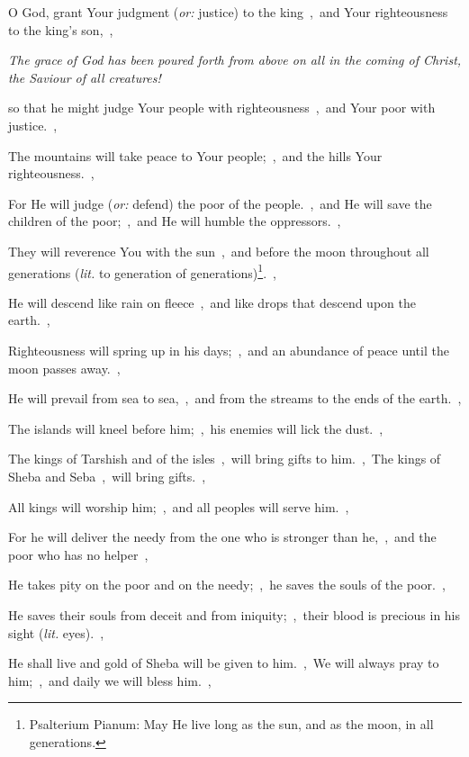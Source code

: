 \documentclass[12pt,twoside,a5paper]{article}
\newcommand{\qanona}[1]{{\liturgicalhint{Qanona.} \emph{#1}}}
\newcommand{\translationoption}[1]{\emph{or:} #1}
\newcommand{\translationliteral}[1]{\emph{lit.} #1}
\begin{document}
\begin{normalparskip}
  O God, grant Your judgment (\translationoption{justice}) to the king~\sep\ and Your righteousness to the king's son,~\sep

  \qanona{The grace of God has been poured forth from above on all in the coming of Christ, the Saviour of all creatures!}

  so that he might judge Your people with righteousness~\sep\ and Your poor with justice.~\sep

  The mountains will take peace to Your people;~\sep\ and the hills Your righteousness.~\sep

  For He will judge (\translationoption{defend}) the poor of the people.~\sep\ and He will save the children of the poor;~\sep\ and He will humble the oppressors.~\sep

  They will reverence You with the sun~\sep\ and before the moon throughout all generations (\translationliteral{to generation of generations})\footnote{Psalterium Pianum: May He live long as the sun, and as the moon, in all generations.}.~\sep

  He will descend like rain on fleece~\sep\ and like drops that descend upon the earth.~\sep

  Righteousness will spring up in his days;~\sep\ and an abundance of peace until the moon passes away.~\sep

  He will prevail from sea to sea,~\sep\ and from the streams to the ends of the earth.~\sep

  The islands will kneel before him;~\sep\ his enemies will lick the dust.~\sep

  The kings of Tarshish and of the isles~\sep\ will bring gifts to him.~\sep\ The kings of Sheba and Seba~\sep\ will bring gifts.~\sep

  All kings will worship him;~\sep\ and all peoples will serve him.~\sep

  For he will deliver the needy from the one who is stronger than he,~\sep\ and the poor who has no helper~\sep

  He takes pity on the poor and on the needy;~\sep\ he saves the souls of the poor.~\sep

  He saves their souls from deceit and from iniquity;~\sep\ their blood is precious in his sight (\translationliteral{eyes}).~\sep

  He shall live and gold of Sheba will be given to him.~\sep\ We will always pray to him;~\sep\ and daily we will bless him.~\sep


\end{normalparskip}
\end{document}
